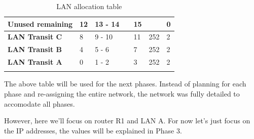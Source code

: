 \documentclass[11pt,a4paper]{report}
\begin{document}
\begin{center}
\begin{longtable}{lllllll}
            \multirow{-2}{*}{\textbf{Unused remaining}}    & \cellcolor[HTML]{C09FE5}12 & 13 - 14             &                 & 15                                     &                                          & 0                                    \\ \hline
            \cellcolor[HTML]{C09FE5}\textbf{LAN Transit C} & 8                          & 9 - 10              &                 & 11                                     & 252                                      & 2                                    \\ \hline
            \cellcolor[HTML]{C09FE5}\textbf{LAN Transit B} & 4                          & 5 - 6               &                 & 7                                      & 252                                      & 2                                    \\ \hline
            \cellcolor[HTML]{C09FE5}\textbf{LAN Transit A} & 0                          & 1 - 2               &                 & 3                                      & 252                                      & 2                                    \\ \hline
            \caption{LAN allocation table}
            \label{tab:lanalloctable}\\
            \end{longtable}
        \end{center}

        The above table will be used for the next phases. Instead of planning for each phase and re-assigning the entire network, the network was fully detailed to accomodate all phases.
        
        However, here we'll focus on router R1 and LAN A. For now let's just focus on the IP addresses, the values will be explained in Phase 3.
\end{document}
